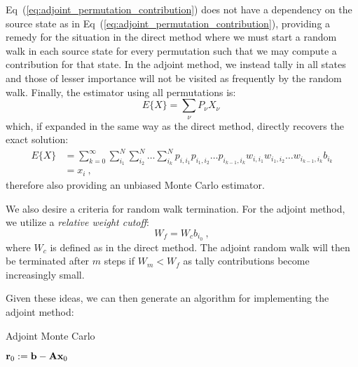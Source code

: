 Eq~(\ref{eq:adjoint_permutation_contribution}) does not have a
dependency on the source state as in
Eq~(\ref{eq:adjoint_permutation_contribution}), providing a remedy for
the situation in the direct method where we must start a random walk
in each source state for every permutation such that we may compute a
contribution for that state. In the adjoint method, we instead tally
in all states and those of lesser importance will not be visited as
frequently by the random walk. Finally, the estimator using all
permutations is:
\begin{equation}
  E\{X\} = \sum_{\nu} P_{\nu} X_{\nu}\:
  \label{eq:adjoint_expectation_value}
\end{equation}
which, if expanded in the same way as the direct method, directly
recovers the exact solution:
\begin{equation}
  \begin{split}
    E\{X\} &=\sum_{k=0}^{\infty}\sum_{i_1}^{N}\sum_{i_2}^{N}\ldots
    \sum_{i_k}^{N} p_{i,i_1}p_{i_1,i_2}\ldots p_{i_{k-1},i_k}
    w_{i,i_1}w_{i_1,i_2}\ldots w_{i_{k-1},i_k} b_{i_k} \\ &= x_i\:,
  \end{split}
  \label{eq:adjoint_expectation_expansion}
\end{equation}
therefore also providing an unbiased Monte Carlo estimator.

We also desire a criteria for random walk termination. For the adjoint
method, we utilize a \textit{relative weight cutoff}:
\begin{equation}
  W_f = W_c b_{i_0}\:,
  \label{eq:relative_weight_cutoff}
\end{equation}
where $W_c$ is defined as in the direct method. The adjoint random
walk will then be terminated after $m$ steps if $W_m < W_f$ as tally
contributions become increasingly small.

Given these ideas, we can then generate an algorithm for implementing
the adjoint method:
\begin{algorithm}[htpb!]
  \caption{Adjoint Monte Carlo}
  \label{alg:adjoint_mc}
  \begin{algorithmic}
    \State $\mathbf{r}_0 := \mathbf{b}-\mathbf{A}\mathbf{x}_0$
  \end{algorithmic}
\end{algorithm}

